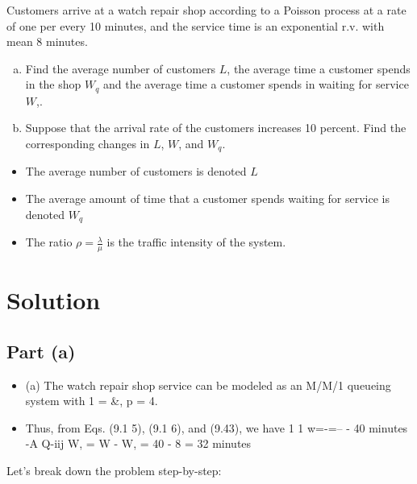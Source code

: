 \documentclass[a4paper12pt]{article}
\begin{document}
\large 




Customers arrive at a watch repair shop according to a Poisson process at a rate of one per 
every 10 minutes, and the service time is an exponential r.v. with mean 8 minutes. 
\begin{enumerate}[(a)]
    \item Find the average number of customers $L$, the average time a customer spends in the shop 
$W_q$ and the average time a customer spends in waiting for service $W$,. 
\item  Suppose that the arrival rate of the customers increases 10 percent. Find the corresponding 
changes in $L$, $W$, and $W_q$. 
\end{enumerate}



\begin{framed}
\begin{itemize}
\item The average number of customers is denoted $L$
\item The average amount of time that a customer spends waiting for service is denoted $W_q$
    \item  The ratio ${\rho = \frac{\lambda}{\mu}}$ is the traffic intensity of the system.
\end{itemize}
\end{framed}
\section*{Solution}
\subsection*{Part (a)}
\begin{itemize}
\item 
(a) The watch repair shop service can be modeled as an M/M/1 queueing system with 1 = &, p = 4. 
\item Thus, 
from Eqs. (9.1 5), (9.1 6), and (9.43), we have 
1 1 w=-=-- - 40 minutes 
-A Q-iij 
W, = W - W, = 40 - 8 = 32 minutes 
\end{itemize}




Let's break down the problem step-by-step:
\end{document}
